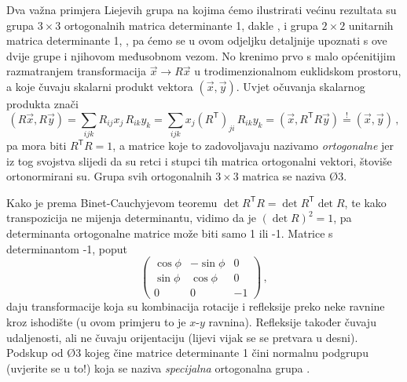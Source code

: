 Dva važna primjera Liejevih grupa na kojima  ćemo ilustrirati većinu rezultata
su grupa $3 \times 3$ ortogonalnih matrica determinante 1, dakle ,
i grupa $2 \times 2$ unitarnih matrica determinante 1, , pa ćemo
se u ovom odjeljku detaljnije upoznati s ove dvije grupe i njihovom
međusobnom vezom.   
No krenimo prvo s malo općenitijim razmatranjem transformacija
$\vec{x} \to R \vec{x}$ u trodimenzionalnom euklidskom prostoru,
a koje čuvaju skalarni produkt vektora $(\vec{x}, \vec{y})$.
Uvjet očuvanja skalarnog produkta znači
\begin{equation}
    (R\vec{x}, R\vec{y}) = \sum_{ijk} R_{ij}x_{j} \, R_{ik} y_{k} = \sum_{ijk} x_{j} (R^\mathsf{T})_{ji}
    \, R_{ik} y_{k} = (\vec{x}, R^{\mathsf{T}} R \vec{y}) \stackrel{!}{=} (\vec{x}, \vec{y}) \,,
\end{equation}
pa mora biti $R^{\mathsf{T}} R = 1$, a matrice koje to zadovoljavaju
nazivamo \emph{ortogonalne} 
jer iz tog svojstva slijedi da su retci i stupci
tih matrica ortogonalni vektori, štoviše ortonormirani su. Grupa svih
ortogonalnih $3 \times 3$ matrica se naziva \O{3}.
 

Kako je prema Binet-Cauchyjevom teoremu $\det R^\mathsf{T} R = \det R^\mathsf{T} \det R$,
te kako transpozicija ne mijenja determinantu, vidimo da je $(\det R)^2 = 1$,
pa determinanta ortogonalne matrice može biti samo 1 ili -1. \label{pag:detO3}
Matrice s determinantom -1, poput 
\begin{equation}
\begin{pmatrix}
\cos\phi & -\sin\phi & 0 \\
\sin\phi & \cos\phi & 0 \\
0 & 0 & -1 \end{pmatrix} \,,
\end{equation}
daju transformacije koja su kombinacija rotacije i refleksije preko
neke ravnine kroz ishodište (u ovom primjeru to je $x$-$y$ ravnina).
Refleksije također čuvaju
udaljenosti, ali ne čuvaju orijentaciju (lijevi vijak se
se pretvara u desni). Podskup od \O{3} kojeg čine
matrice determinante 1 čini normalnu podgrupu (uvjerite se u to!)
koja se naziva \emph{specijalna} ortogonalna grupa .
 

